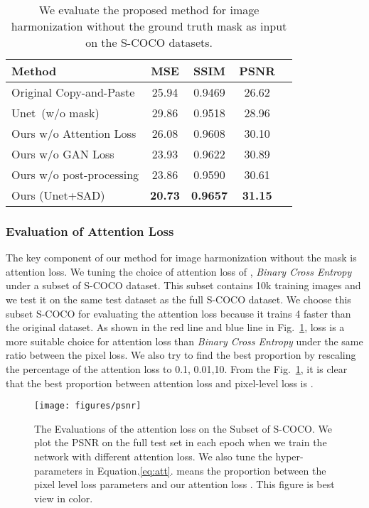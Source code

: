 \begin{table}[h]
\begin{center}
\begin{tabular}{|l|c|c|c|c|}
\hline
Method & MSE & SSIM & PSNR \\

\hline\hline
Original Copy-and-Paste  & 25.94 & 0.9469 & 26.62 \\
Unet~(w/o mask) ~\cite{Isola:2016tp}  &  29.86     &    0.9518     &   28.96  \\
Ours w/o Attention Loss &  26.08 & 0.9608 & 30.10  \\
Ours w/o GAN Loss        &   23.93   &  0.9622     &   30.89  \\
Ours w/o post-processing    & 23.86 & 0.9590 & 30.61 \\
Ours (Unet+SAD)  &   \textbf{20.73}    &    \textbf{0.9657}     &  \textbf{31.15}  \\
\hline
\end{tabular}
\end{center}

\caption{We evaluate the proposed method for image harmonization without the ground truth mask as input on the S-COCO datasets.}
\label{tab:umask}
\vspace{-1.5em}
\end{table}

\subsubsection{Evaluation of Attention Loss}
The key component of our method for image harmonization without the mask is attention loss. We tuning the choice of attention loss of , \textit{Binary Cross Entropy} under a subset of S-COCO dataset. This subset contains 10k training images and we test it on the same test dataset as the full S-COCO dataset. We choose this subset S-COCO for evaluating the attention loss because it trains 4 faster than the original dataset. As shown in the red line and blue line in Fig.~\ref{fig:attpsnr},  loss is a more suitable choice for attention loss than \textit{Binary Cross Entropy} under the same ratio between the pixel loss. We also try to find the best proportion by rescaling the percentage of the attention loss to 0.1, 0.01,10. From the Fig.~\ref{fig:attpsnr}, it is clear that the best proportion between attention loss and pixel-level loss is .

\begin{figure}[h]
  \texttt{[image: figures/psnr]}
  \caption{The Evaluations of the attention loss on the Subset of S-COCO. We plot the PSNR on the full test set in each epoch when we train the network with different attention loss. We also tune the hyper-parameters  in Equation.\ref{eq:att}.  means the proportion between the pixel level loss parameters  and our attention loss . This figure is best view in color.}
    \label{fig:attpsnr}
    \vspace{-1.5em}
\end{figure}

